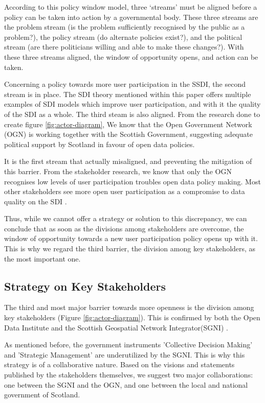 According to this policy window model, three ‘streams’ must be aligned before a policy can be taken into action by a governmental body. These three streams are the problem stream (is the problem sufficiently recognised by the public as a problem?), the policy stream (do alternate policies exist?), and the political stream (are there politicians willing and able to make these changes?). With these three streams aligned, the window of opportunity opens, and action can be taken. 

Concerning a policy towards more user participation in the SSDI, the second stream is in place. The SDI theory mentioned within this paper offers multiple examples of SDI models which improve user participation, and with it the quality of the SDI as a whole. The third steam is also aligned. From the research done to create figure \ref{fig:actor-diagram}, We know that the Open Government Network (OGN) is working together with the Scottish Government, suggesting adequate political support by Scotland in favour of open data policies.

It is the first stream that actually misaligned, and preventing the mitigation of this barrier. From the stakeholder research, we know that only the OGN recognises low levels of user participation troubles open data policy making. Most other stakeholders see more open user participation as a compromise to data quality on the SDI \citep{IS_local_SSDI}. 

Thus, while we cannot offer a strategy or solution to this discrepancy, we can conclude that as soon as the divisions among stakeholders are overcome, the window of opportunity towards a new user participation policy opens up with it. This is why we regard the third barrier, the division among key stakeholders, as the most important one. 


\subsection{Strategy on Key Stakeholders}

The third and most major barrier towards more openness is the division among key stakeholders (Figure \ref{fig:actor-diagram}). This is confirmed by both the Open Data Institute \citep{odi_geodatainfrastructure} and the Scottish Geospatial Network Integrator(SGNI) \citep[SGNI]{scottish_geospatial_network_integrator}.

As mentioned before, the government instruments 'Collective Decision Making' and 'Strategic Management' are  underutilized by the SGNI. This is why this strategy is of a collaborative nature. Based on the visions and statements published by the stakeholders themselves, we suggest two major collaborations: one between the SGNI and the OGN, and one between the local and national government of Scotland.


